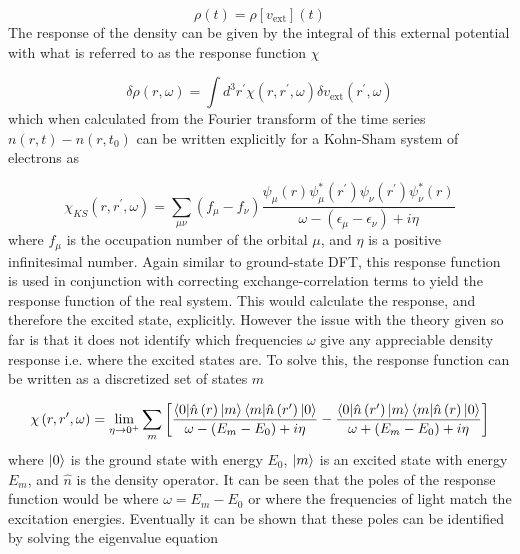 \begin{equation}
\rho\left(t\right) = \rho\left[v_{\text{ext}}\right]\left(t\right)
\end{equation}
%
The response of the density can be given by the integral of this external potential
with what is referred to as the response function $\chi$

\begin{equation}
    \delta \rho \left(r, \omega \right) = \int d^3 r^\prime \chi \left(r, r^\prime, \omega \right) \delta v_{\text{ext}} \left(r^\prime, \omega \right)
\end{equation}
%
which when calculated from the Fourier transform of the time series $n\left(r, t\right) - n\left(r, t_0\right)$
can be written explicitly for a Kohn-Sham system of electrons as

\begin{equation}
    \chi_{KS} \left(r, r^\prime, \omega \right) = \sum_{\mu\nu} \left(f_\mu - f_\nu \right) \frac{\psi_\mu\left(r\right)\psi^\ast_\mu\left(r^\prime\right) \psi_\nu\left(r^\prime\right) \psi^\ast_\nu\left(r\right)}{\omega - \left(\epsilon_\mu - \epsilon_\nu\right) + i\eta}
\end{equation}
%
where $f_\mu$ is the occupation number of the orbital $\mu$, and $\eta$ is a positive
infinitesimal number. Again similar to ground-state DFT, this response function 
is used in conjunction with correcting exchange-correlation terms to yield the response
function of the real system. This would calculate the response, and therefore the 
excited state, explicitly. However the issue with the theory given so far is that
it does not identify which frequencies $\omega$ give any appreciable density response
i.e. where the excited states are. To solve this, the response function can be written
as a discretized set of states $m$

\begin{equation}
    \chi\left(r, r^\prime, \omega \right) = \lim_{\eta \to 0^+} \sum_m \left[ \frac{\braket{0|\hat{n}\left(r\right)|m}\braket{m|\hat{n}\left(r^\prime\right)|0}}{\omega - \left(E_m - E_0\right) + i\eta} - \frac{\braket{0|\hat{n}\left(r^\prime\right)|m}\braket{m|\hat{n}\left(r\right)|0}}{\omega + \left(E_m - E_0\right) + i\eta} \right]
\end{equation}
%
where $\ket{0}$ is the ground state with energy $E_0$, $\ket{m}$ is an excited state
with energy $E_m$, and $\hat{n}$ is the density operator. It can be seen that the
poles of the response function would be where $\omega = E_m - E_0$ or where the 
frequencies of light match the excitation energies. Eventually it can be shown that
these poles can be identified by solving the eigenvalue equation

